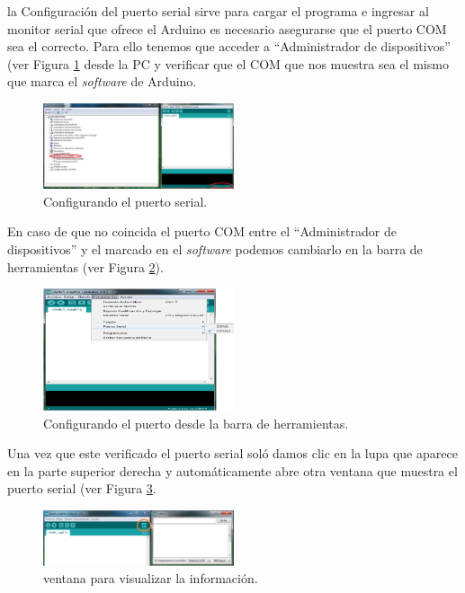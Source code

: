 la Configuración del puerto serial sirve para cargar el programa e ingresar al monitor serial que ofrece el Arduino es necesario asegurarse que el puerto COM sea el correcto.  Para ello tenemos que acceder a “Administrador de dispositivos” (ver Figura \ref{conf_puerto} desde la PC y verificar que el COM que nos muestra sea el mismo que marca el \textit{software} de Arduino.

\begin{figure}[H]
\centering
\includegraphics[width=0.5\textwidth]{metodologia/gas_6.png}
\caption{Configurando el puerto serial. }
\label{conf_puerto}
\end{figure}
%

En caso de que no coincida el puerto COM entre el “Administrador de dispositivos” y el marcado en el \textit{software} podemos cambiarlo en la barra de herramientas (ver Figura \ref{conf_puerto2}).

\begin{figure}[H]
\centering
\includegraphics[width=0.5\textwidth]{metodologia/gas_7.png}
\caption{Configurando el puerto desde la barra de herramientas. }
\label{conf_puerto2}
\end{figure}


Una vez que este verificado el puerto serial soló damos clic en la lupa que aparece en la parte superior derecha y automáticamente abre otra ventana que muestra el puerto serial (ver Figura \ref{conf_puerto22}.

\begin{figure}[H]
\centering
\includegraphics[width=0.5\textwidth]{metodologia/gas_8.png}
\caption{ventana para visualizar la información. }
\label{conf_puerto22}
\end{figure}

